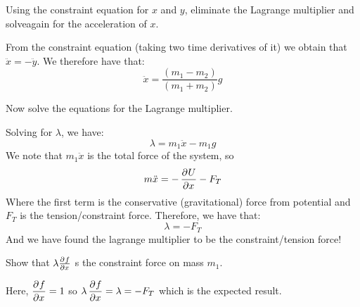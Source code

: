 \begin{p}
Using the constraint equation for $x$ and $y$, eliminate the Lagrange multiplier and solveagain for the acceleration of $x$.
\end{p}
\begin{s}
From the constraint equation (taking two time derivatives of it) we obtain that $\ddot{x} = -\ddot{y}$. We therefore have that:
\[\ddot{x} = \frac{(m_1 - m_2)}{(m_1 + m_2)}g\]
\end{s}

\begin{p}
Now solve the equations for the Lagrange multiplier.
\end{p}
\begin{s}
Solving for $\lambda$, we have:
\[\lambda = m_1\ddot{x} - m_1g\]
We note that $m_1\ddot{x}$ is the total force of the system, so
\[m\ddot{x} = -\dpd{U}{x} - F_{T}\]
Where the first term is the conservative (gravitational) force from potential and $F_T$ is the tension/constraint force. Therefore, we have that:
\[\lambda = -F_T\]
And we have found the lagrange multiplier to be the constraint/tension force!
\end{s}

\begin{p}
Show that $\lambda \pd{f}{x}$ s the constraint force on mass $m_1$.
\end{p}
\begin{s}
Here, $\dpd{f}{x} = 1$ so $\lambda\dpd{f}{x} = \lambda = -F_T$ which is the expected result.
\end{s}